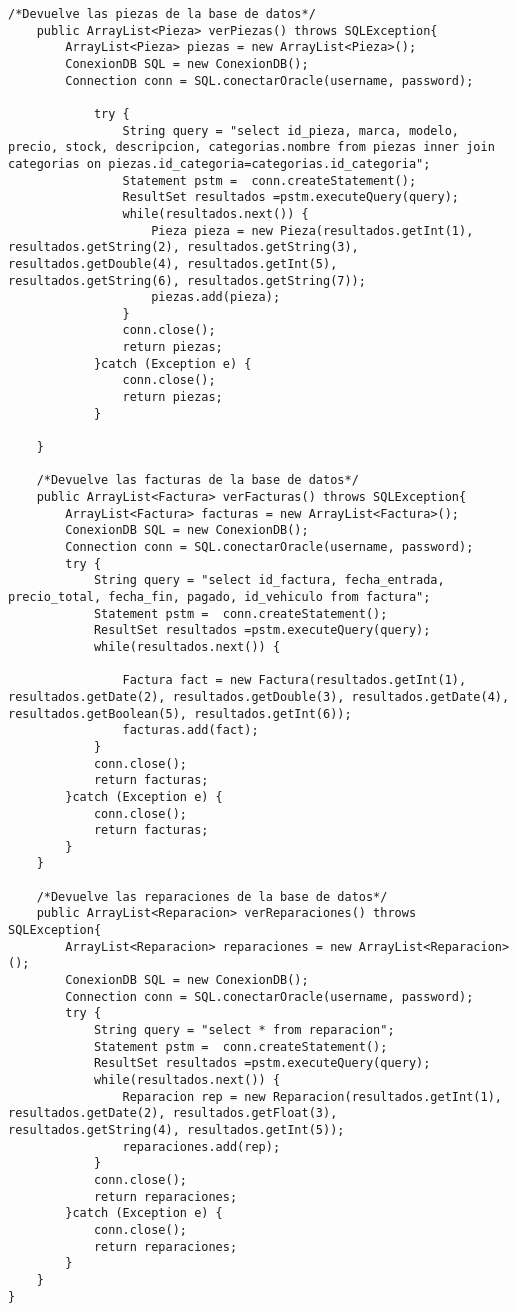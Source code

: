 \begin{lstlisting}[caption=Consultas.java (App Escritorio)]
	/*Devuelve las piezas de la base de datos*/
	public ArrayList<Pieza> verPiezas() throws SQLException{
		ArrayList<Pieza> piezas = new ArrayList<Pieza>();
		ConexionDB SQL = new ConexionDB();
		Connection conn = SQL.conectarOracle(username, password);

			try {
				String query = "select id_pieza, marca, modelo, precio, stock, descripcion, categorias.nombre from piezas inner join categorias on piezas.id_categoria=categorias.id_categoria";
				Statement pstm =  conn.createStatement();
				ResultSet resultados =pstm.executeQuery(query);
				while(resultados.next()) {
					Pieza pieza = new Pieza(resultados.getInt(1), resultados.getString(2), resultados.getString(3), resultados.getDouble(4), resultados.getInt(5), resultados.getString(6), resultados.getString(7));
					piezas.add(pieza);
				}
				conn.close();
				return piezas;
			}catch (Exception e) {
				conn.close();
				return piezas;
			}

	}
	
	/*Devuelve las facturas de la base de datos*/
	public ArrayList<Factura> verFacturas() throws SQLException{
		ArrayList<Factura> facturas = new ArrayList<Factura>();
		ConexionDB SQL = new ConexionDB();
		Connection conn = SQL.conectarOracle(username, password);
		try {
			String query = "select id_factura, fecha_entrada, precio_total, fecha_fin, pagado, id_vehiculo from factura";
			Statement pstm =  conn.createStatement();
			ResultSet resultados =pstm.executeQuery(query);
			while(resultados.next()) {
				
				Factura fact = new Factura(resultados.getInt(1), resultados.getDate(2), resultados.getDouble(3), resultados.getDate(4), resultados.getBoolean(5), resultados.getInt(6));
				facturas.add(fact);
			}
			conn.close();
			return facturas;
		}catch (Exception e) {
			conn.close();
			return facturas;
		}
	}
	
	/*Devuelve las reparaciones de la base de datos*/
	public ArrayList<Reparacion> verReparaciones() throws SQLException{
		ArrayList<Reparacion> reparaciones = new ArrayList<Reparacion>();
		ConexionDB SQL = new ConexionDB();
		Connection conn = SQL.conectarOracle(username, password);
		try {
			String query = "select * from reparacion";
			Statement pstm =  conn.createStatement();
			ResultSet resultados =pstm.executeQuery(query);
			while(resultados.next()) {
				Reparacion rep = new Reparacion(resultados.getInt(1), resultados.getDate(2), resultados.getFloat(3), resultados.getString(4), resultados.getInt(5));
				reparaciones.add(rep);
			}
			conn.close();
			return reparaciones;
		}catch (Exception e) {
			conn.close();
			return reparaciones;
		}
	}
}
\end{lstlisting}
